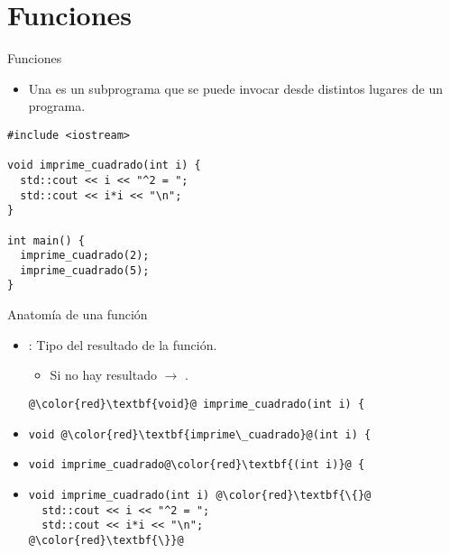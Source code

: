 \section{Funciones}

\begin{frame}[t,fragile]{Funciones}
\begin{itemize}
  \item Una  es un subprograma que se puede invocar
        desde distintos lugares de un programa.
\end{itemize}
\begin{lstlisting}
#include <iostream>

void imprime_cuadrado(int i) {
  std::cout << i << "^2 = ";
  std::cout << i*i << "\n";
}

int main() {
  imprime_cuadrado(2);
  imprime_cuadrado(5);
}
\end{lstlisting}
\end{frame}

\begin{frame}[t,fragile]{Anatomía de una función}
\begin{itemize}
  \item {}: Tipo del resultado de la función.
    \begin{itemize}
      \item Si no hay resultado $\rightarrow$ .
    \end{itemize}
\begin{lstlisting}[escapechar=@]
@\color{red}\textbf{void}@ imprime_cuadrado(int i) {
\end{lstlisting}

  \item {}
\begin{lstlisting}[escapechar=@]
void @\color{red}\textbf{imprime\_cuadrado}@(int i) {
\end{lstlisting}

  \item {}
\begin{lstlisting}[escapechar=@]
void imprime_cuadrado@\color{red}\textbf{(int i)}@ {
\end{lstlisting}

  \item {}
\begin{lstlisting}[escapechar=@]
void imprime_cuadrado(int i) @\color{red}\textbf{\{}@
  std::cout << i << "^2 = ";
  std::cout << i*i << "\n";
@\color{red}\textbf{\}}@
\end{lstlisting}
\end{itemize}
\end{frame}
